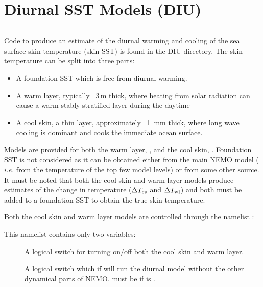 \documentclass[../main/NEMO_manual]{subfiles}
\begin{document}
\chapter{Diurnal SST Models (DIU)}
\label{chap:DIU}

\minitoc


\newpage
$\ $\newline %

Code to produce an estimate of the diurnal warming and cooling of the sea surface skin
temperature (skin SST) is found in the DIU directory.  
The skin temperature can be split into three parts:
\begin{itemize}
\item
  A foundation SST which is free from diurnal warming.
\item
  A warm layer, typically ~3\,m thick,
  where heating from solar radiation can cause a warm stably stratified layer during the daytime
\item
  A cool skin, a thin layer, approximately ~1\, mm thick,
  where long wave cooling is dominant and cools the immediate ocean surface.
\end{itemize}

Models are provided for both the warm layer, , and the cool skin, .
Foundation SST is not considered as it can be obtained either from the main NEMO model
($i.e.$ from the temperature of the top few model levels) or from some other source.  
It must be noted that both the cool skin and warm layer models produce estimates of the change in temperature
($\Delta T_{\rm{cs}}$ and $\Delta T_{\rm{wl}}$) and
both must be added to a foundation SST to obtain the true skin temperature.

Both the cool skin and warm layer models are controlled through the namelist :

This namelist contains only two variables:
\begin{description}
\item[]
  A logical switch for turning on/off both the cool skin and warm layer.
\item[]
  A logical switch which if  will run the diurnal model without the other dynamical parts of NEMO.
   must be  if  is .
\end{description}
\end{document}
